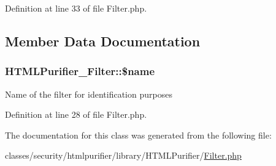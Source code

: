 Definition at line 33 of file Filter.\+php.



\subsection{Member Data Documentation}
\hypertarget{classHTMLPurifier__Filter_a5ba5b60834e169792f9005bc75000c21}{
\subsubsection[{\$name}]{\setlength{\rightskip}{0pt plus 5cm}H\+T\+M\+L\+Purifier\+\_\+\+Filter\+::\$name}}\label{classHTMLPurifier__Filter_a5ba5b60834e169792f9005bc75000c21}
Name of the filter for identification purposes 

Definition at line 28 of file Filter.\+php.



The documentation for this class was generated from the following file\+:\begin{DoxyCompactItemize}
\item 
classes/security/htmlpurifier/library/\+H\+T\+M\+L\+Purifier/\hyperlink{Filter_8php}{Filter.\+php}\end{DoxyCompactItemize}
